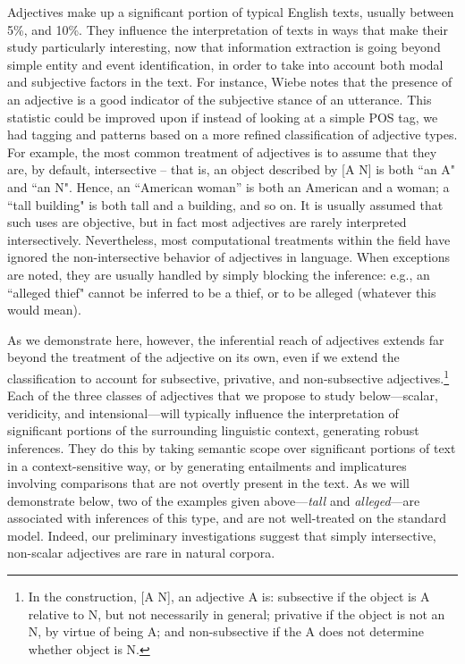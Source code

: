 \documentclass[10pt]{article}
\begin{document}
Adjectives make up a significant portion of typical English texts, usually between 5\%, and 10\%. They influence the interpretation of texts in ways that make their study particularly interesting, now that information extraction is going beyond simple entity and event identification, in order to take into account both modal and subjective factors in the text. For instance, Wiebe \cite{wiebe2000learning} notes that the presence of an adjective is a good indicator of the subjective stance of an utterance. This statistic could be improved upon if instead of looking at a simple POS tag, we had  tagging and patterns based on a more refined  classification of adjective types. For example, the most common treatment of adjectives is to assume that they are, by default, {\sc intersective} -- that is, an  object described by [A N] is both ``an A" and ``an N". Hence, an ``American woman'' is both an American and a woman; a ``tall building" is both tall and a building, and so on. 
It is usually assumed that such uses are objective, but in fact most adjectives are rarely interpreted  intersectively. Nevertheless, most computational treatments  within the field have  ignored the non-intersective behavior of adjectives in language.   When exceptions are noted, they are usually handled by simply blocking the inference: e.g., an ``alleged thief" cannot be inferred to be a thief, or to be alleged (whatever this would mean). 





As we demonstrate here, however,  the inferential reach of adjectives extends far beyond the treatment of the adjective on its own,  even if we extend the classification to  account for subsective, privative, and non-subsective adjectives.\footnote{
In the construction, [A N], an adjective A is:  {\sc subsective} if the object is A relative to N, but not necessarily in general; {\sc privative} if the object 
 is not an N, by virtue of being A; and 
 {\sc non-subsective} if the A  does not determine whether object is N.}
 Each of the three classes of adjectives that we propose to study below---scalar, veridicity, and intensional---will typically influence the interpretation of significant portions of the surrounding linguistic context, generating robust inferences. They do this by taking semantic scope over significant portions of text in a context-sensitive way, or by generating entailments and implicatures involving comparisons that are not overtly present in the text. 
%
As we will demonstrate below, two of the examples given above---\emph{tall} and \emph{alleged}---are associated with inferences of this type, and are not well-treated on the standard model. Indeed, our preliminary investigations suggest that simply intersective, non-scalar adjectives are rare in natural corpora.
\end{document}
